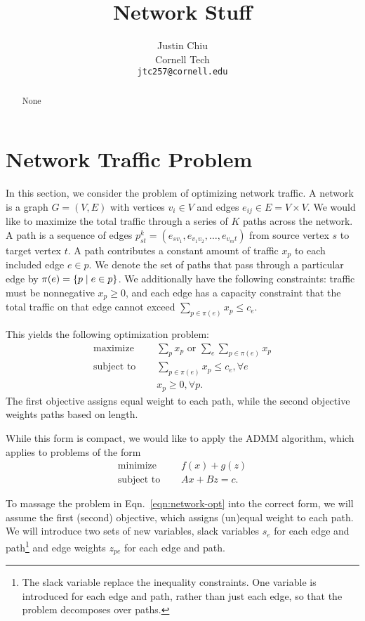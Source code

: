 \documentclass[11pt]{article}
\title{Network Stuff}
\author{Justin Chiu \\
  Cornell Tech \\
  \texttt{jtc257@cornell.edu}}
\begin{document}
\maketitle
\begin{abstract}
None
\end{abstract}

\section{Network Traffic Problem}
In this section, we consider the problem of optimizing network traffic.
A network is a graph $G = (V,E)$ with vertices $v_i\in V$ and edges
$e_{ij}\in E = V\times V$.
We would like to maximize the total traffic through a series of $K$ paths across the network.
A path is a sequence of edges $p_{st}^k = (e_{sv_1},e_{v_1v_2},\ldots,e_{v_mt})$
from source vertex $s$ to target vertex $t$.
A path contributes a constant amount of traffic $x_p$ to each included edge $e\in p$.
We denote the set of paths that pass through a particular edge by
$\pi(e) = \left\{p \mid e \in p\right\}$.
We additionally have the following constraints: traffic must be nonnegative $x_p \geq 0$,
and each edge has a capacity constraint that the total traffic on that
edge cannot exceed $\sum_{p\in\pi(e)} x_p \le c_e$.

This yields the following optimization problem:
\begin{equation}
\label{eqn:network-opt}
\begin{aligned}
\textrm{maximize } \quad & \sum_{p} x_p \textrm{ or } \sum_{e} \sum_{p\in\pi(e)}x_{p}\\
\textrm{subject to } \quad &\sum_{p\in\pi(e)}x_p \le c_e, \forall e\\
& x_p \geq 0, \forall p.
\end{aligned}
\end{equation}
The first objective assigns equal weight to each path, while the second
objective weights paths based on length.

While this form is compact, we would like to apply the ADMM algorithm,
which applies to problems of the form
\begin{equation}
\label{eqn:admm}
\begin{aligned}
\textrm{minimize } \quad & f(x) + g(z)\\
\textrm{subject to } \quad & Ax + Bz = c.
\end{aligned}
\end{equation}

To massage the problem in Eqn.~\ref{eqn:network-opt} into the correct form,
we will assume the first (second) objective, which assigns (un)equal weight to each path.
We will introduce two sets of new variables, slack variables $s_e$ for each edge and path\footnote{
The slack variable replace the inequality constraints.
One variable is introduced for each edge and path, rather than just each edge,
so that the problem decomposes over paths.
}
and edge weights $z_{pe}$ for each edge and path.
\end{document}
